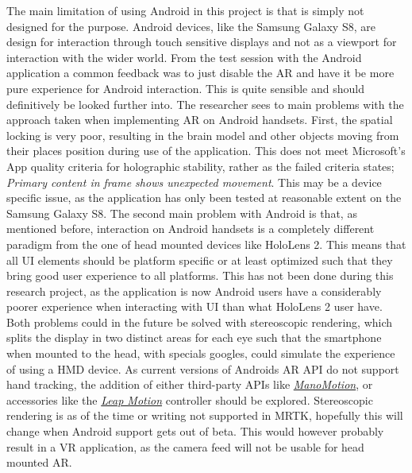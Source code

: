 The main limitation of using Android in this project is that is simply not designed for the purpose. Android devices, like the Samsung Galaxy S8, are design for interaction through touch sensitive displays and not as a viewport for interaction with the wider world. From the test session with the Android application a common feedback was to just disable the AR and have it be more pure experience for Android interaction. This is quite sensible and should definitively be looked further into. The researcher sees to main problems with the approach taken when implementing AR on Android handsets. First, the spatial locking is very poor, resulting in the brain model and other objects moving from their places position during use of the application. This does not meet Microsoft's App quality criteria for holographic stability, rather as the failed criteria states; \textit{Primary content in frame shows unexpected movement}. This may be a device specific issue, as the application has only been tested at reasonable extent on the Samsung Galaxy S8.
The second main problem with Android is that, as mentioned before, interaction on Android handsets is a completely different paradigm from the one of head mounted devices like  HoloLens 2. This means that all UI elements should be platform specific or at least optimized such that they bring good user experience to all platforms. This has not been done during this research project, as the application is now Android users have a considerably poorer experience when interacting with UI than what HoloLens 2 user have. 
Both problems could in the future be solved with stereoscopic rendering, which splits the display in two distinct areas for each eye such that the smartphone when mounted to the head, with specials googles, could simulate the experience of using a HMD device. As current versions of Androids AR API do not support hand tracking, the addition of either third-party APIs like \href{https://www.manomotion.com}{\textit{ManoMotion}}, or accessories like the \href{https://www.ultraleap.com/product/leap-motion-controller/}{\textit{Leap Motion}} controller should be explored. Stereoscopic rendering is as of the time or writing not supported in MRTK, hopefully this will change when Android support gets out of beta. This would however probably result in a VR application, as the camera feed will not be usable for head mounted AR.


